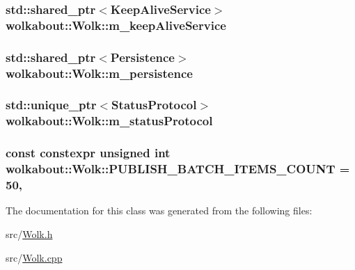 \subsubsection[{\texorpdfstring{m\+\_\+keep\+Alive\+Service}{m_keepAliveService}}]{\setlength{\rightskip}{0pt plus 5cm}std\+::shared\+\_\+ptr$<$Keep\+Alive\+Service$>$ wolkabout\+::\+Wolk\+::m\+\_\+keep\+Alive\+Service\hspace{0.3cm}{\ttfamily [private]}}\hypertarget{classwolkabout_1_1_wolk_a03e41fa47eb856bfaab0adfc5e90770c}{}\label{classwolkabout_1_1_wolk_a03e41fa47eb856bfaab0adfc5e90770c}
\subsubsection[{\texorpdfstring{m\+\_\+persistence}{m_persistence}}]{\setlength{\rightskip}{0pt plus 5cm}std\+::shared\+\_\+ptr$<$Persistence$>$ wolkabout\+::\+Wolk\+::m\+\_\+persistence\hspace{0.3cm}{\ttfamily [private]}}\hypertarget{classwolkabout_1_1_wolk_a648fe96503a4f17efe4a6904d995633c}{}\label{classwolkabout_1_1_wolk_a648fe96503a4f17efe4a6904d995633c}
\subsubsection[{\texorpdfstring{m\+\_\+status\+Protocol}{m_statusProtocol}}]{\setlength{\rightskip}{0pt plus 5cm}std\+::unique\+\_\+ptr$<$Status\+Protocol$>$ wolkabout\+::\+Wolk\+::m\+\_\+status\+Protocol\hspace{0.3cm}{\ttfamily [private]}}\hypertarget{classwolkabout_1_1_wolk_ab410d711778fd39cba66ebac0c6d1929}{}\label{classwolkabout_1_1_wolk_ab410d711778fd39cba66ebac0c6d1929}
\subsubsection[{\texorpdfstring{P\+U\+B\+L\+I\+S\+H\+\_\+\+B\+A\+T\+C\+H\+\_\+\+I\+T\+E\+M\+S\+\_\+\+C\+O\+U\+NT}{PUBLISH_BATCH_ITEMS_COUNT}}]{\setlength{\rightskip}{0pt plus 5cm}const constexpr unsigned int wolkabout\+::\+Wolk\+::\+P\+U\+B\+L\+I\+S\+H\+\_\+\+B\+A\+T\+C\+H\+\_\+\+I\+T\+E\+M\+S\+\_\+\+C\+O\+U\+NT = 50\hspace{0.3cm}{\ttfamily [static]}, {\ttfamily [private]}}\hypertarget{classwolkabout_1_1_wolk_a4546eac23e520d87ab3e335740a044f3}{}\label{classwolkabout_1_1_wolk_a4546eac23e520d87ab3e335740a044f3}


The documentation for this class was generated from the following files\+:\begin{DoxyCompactItemize}
\item 
src/\hyperlink{_wolk_8h}{Wolk.\+h}\item 
src/\hyperlink{_wolk_8cpp}{Wolk.\+cpp}\end{DoxyCompactItemize}
